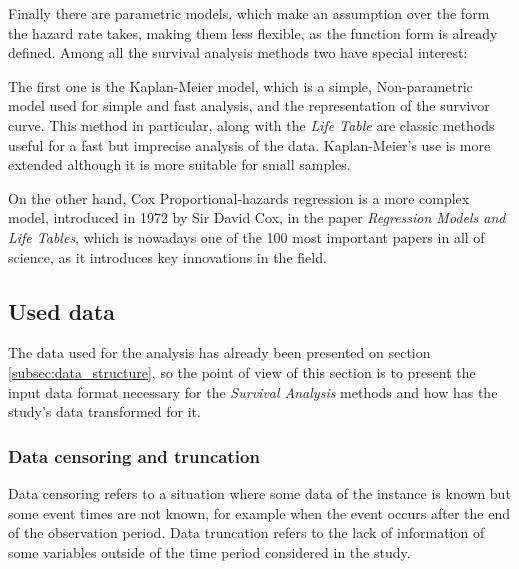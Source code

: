\documentclass[11pt]{article} %
\begin{document}
    Finally there are parametric models, which make an assumption over the form the hazard rate takes, making them less flexible, as the function form is already defined. Among all the survival analysis methods two have special interest:

    The first one is the Kaplan-Meier model, which is a simple, Non-parametric model used for simple and fast analysis, and the representation of the survivor curve. This method in particular, along with the \emph{Life Table} are classic methods useful for a fast but imprecise analysis of the data. Kaplan-Meier's use is more extended although it is more suitable for small samples.

    On the other hand, Cox Proportional-hazards regression is a more complex model, introduced in 1972 by Sir David Cox, in the paper \emph{Regression Models and Life Tables}, which is nowadays one of the 100 most important papers in all of science, as it introduces key innovations in the field.

  \subsection{Used data}

    The data used for the analysis has already been presented on section \ref{subsec:data_structure}, so the point of view of this section is to present the input data format necessary for the \emph{Survival Analysis} methods and how has the study's data transformed for it.

    \subsubsection{Data censoring and truncation}
      \label{subsubsec:censoring}

      Data censoring refers to a situation where some data of the instance is known but some event times are not known, for example when the event occurs after the end of the observation period. Data truncation refers to the lack of information of some variables outside of the time period considered in the study.
\end{document}
